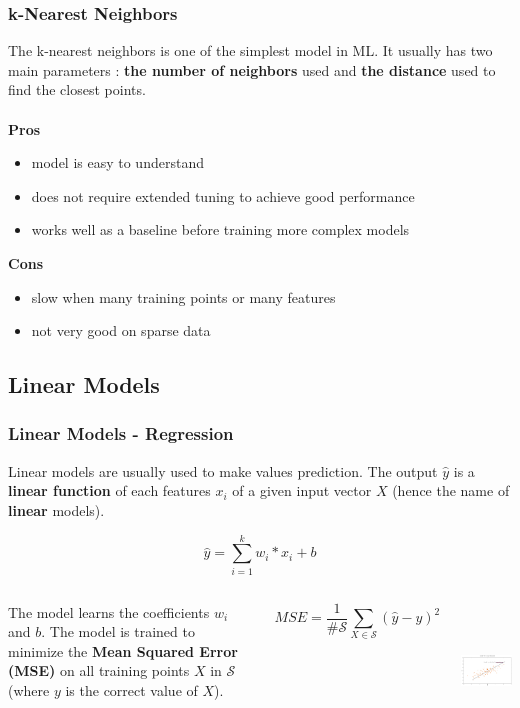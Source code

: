 \documentclass{beamer}
\begin{document}
\begin{frame}
  \frametitle{k-Nearest Neighbors}
  The k-nearest neighbors is one of the simplest model in ML. It usually has two
  main parameters : \textbf{the number of neighbors} used and \textbf{the
  distance} used to find the closest points.
  \\~\\
  \textbf{Pros}
  \begin{itemize}
    \item model is easy to understand
    \item does not require extended tuning to achieve good performance
    \item works well as a baseline before training more complex models
  \end{itemize}

  \textbf{Cons}
  \begin{itemize}
    \item slow when many training points or many features
    \item not very good on sparse data
  \end{itemize}
\end{frame}

\subsection{Linear Models}
\begin{frame}
  \frametitle{Linear Models - Regression}
  Linear models are usually used to make values prediction. The output $\hat{y}$
  is a \textbf{linear function} of each features $x_i$ of a given input vector
  $X$ (hence the name of \textbf{linear} models).

  \begin{equation*}
    \hat{y} = \sum_{i = 1}^k w_i * x_i + b
  \end{equation*}

  \begin{columns}
      \parbox{\linewidth}{The model learns the coefficients $w_i$ and $b$. The
      model is trained to minimize the \textbf{Mean Squared Error (MSE)} on all
      training points $X$ in $\mathcal{S}$ (where $y$ is the correct value of
      $X$).

      \begin{equation*}
        MSE = \frac{1}{\#\mathcal{S}} \sum_{X \in \mathcal{S}} (\hat{y} - y)^2
      \end{equation*}
      }

      \centering
      \includegraphics[height=3.6cm]{img/linear_reg.png}
  \end{columns}
\end{frame}
\end{document}
